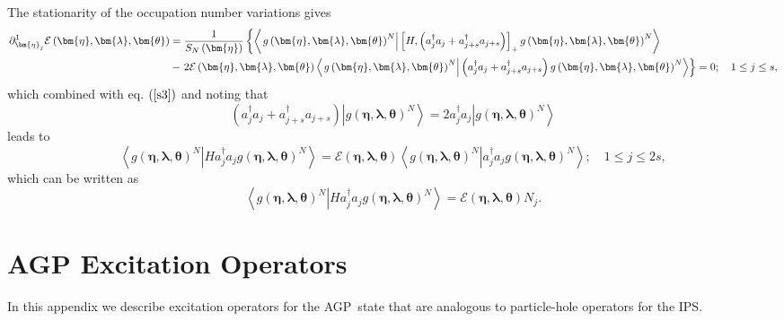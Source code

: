\documentclass{preprint}
\begin{document}
The stationarity of the occupation number variations gives
\begin{align}
\partial_{\bm{\eta}_{j}}^{1}\mathcal{E}\left( \bm{\eta},\bm{\lambda},%
\bm{\theta}\right) & =\frac{1}{S_{N}\left( \bm{\eta}\right) }\left\{
\left\langle \left. g\left( \bm{\eta },\bm{\lambda},\bm{\theta}\right)
^{N}\right\vert \left[ H,\left(
a_{j}^{\dagger}a_{j}+a_{j+s}^{\dagger}a_{j+s}\right) \right] _{+}g\left( %
\bm{\eta},\bm{\lambda},\bm{\theta}\right) ^{N}\right\rangle \right.  \notag
\\
& -\left. 2\mathcal{E}\left( \bm{\eta},\bm{\lambda},\bm{\theta }\right)
\left\langle \left. g\left( \bm{\eta},\bm{\lambda },\bm{\theta}\right)
^{N}\right\vert \left( a_{j}^{\dagger}a_{j}+a_{j+s}^{\dagger}a_{j+s}\right)
g\left( \bm{\eta},\bm{\lambda },\bm{\theta}\right) ^{N}\right\rangle
\right\} =0;\quad1\leq j\leq s,
\end{align}
which combined with eq. $\left( \ref{s3}\right) $ and noting that
\begin{equation}
\left( a_{j}^{\dagger}a_{j}+a_{j+s}^{\dagger}a_{j+s}\right) \left\vert
g\left( \bm{\eta},\bm{\lambda},\bm{\theta}\right) ^{N}\right\rangle
=2a_{j}^{\dagger}a_{j}\left\vert g\left( \bm{\eta },\bm{\lambda},\bm{\theta}%
\right) ^{N}\right\rangle
\end{equation}
leads to
\begin{equation}
\left\langle \left. g\left( \bm{\eta},\bm{\lambda},\bm{\theta }\right)
^{N}\right\vert Ha_{j}^{\dagger}a_{j}g\left( \bm{\eta },\bm{\lambda},%
\bm{\theta}\right) ^{N}\right\rangle =\mathcal{E}\left( \bm{\eta},%
\bm{\lambda},\bm{\theta}\right) \left\langle \left. g\left( \bm{\eta},%
\bm{\lambda},\bm{\theta}\right) ^{N}\right\vert a_{j}^{\dagger}a_{j}g\left( %
\bm{\eta},\bm{\lambda },\bm{\theta}\right) ^{N}\right\rangle ;\quad1\leq
j\leq2s,
\end{equation}
which can be written as
\begin{equation}
\left\langle \left. g\left( \bm{\eta},\bm{\lambda},\bm{\theta }\right)
^{N}\right\vert Ha_{j}^{\dagger}a_{j}g\left( \bm{\eta },\bm{\lambda},%
\bm{\theta}\right) ^{N}\right\rangle =\mathcal{E}\left( \bm{\eta},%
\bm{\lambda},\bm{\theta}\right) N_{j}.
\end{equation}

\section{AGP Excitation Operators\label{q_op}}

In this appendix we describe excitation operators for the AGP\ state that
are analogous to particle-hole operators for the IPS.
\end{document}
